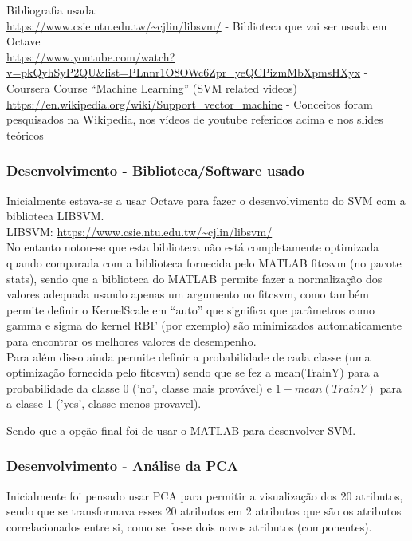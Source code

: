 \documentclass[portugues,final]{revdetua}
\begin{document}
Bibliografia usada:\\
\url{https://www.csie.ntu.edu.tw/~cjlin/libsvm/} - Biblioteca que vai ser usada em Octave\\
\url{https://www.youtube.com/watch?v=pkQyhSyP2QU&list=PLnnr1O8OWc6Zpr_yeQCPizmMbXpmsHXyx} - Coursera Course “Machine Learning” (SVM related videos)\\
\url{https://en.wikipedia.org/wiki/Support_vector_machine} - Conceitos foram pesquisados na Wikipedia, nos vídeos de youtube referidos acima e nos slides teóricos

\subsubsection{Desenvolvimento - Biblioteca/Software usado}
Inicialmente estava-se a usar Octave para fazer o desenvolvimento do SVM com a biblioteca LIBSVM.\\
LIBSVM: \url{https://www.csie.ntu.edu.tw/~cjlin/libsvm/}\\
No entanto notou-se que esta biblioteca não está completamente optimizada quando comparada com a biblioteca fornecida pelo MATLAB fitcsvm (no pacote stats), sendo que a biblioteca do MATLAB permite fazer a normalização dos valores adequada usando apenas um argumento no fitcsvm, como também permite definir o KernelScale em “auto” que significa que parâmetros como gamma e sigma do kernel RBF (por exemplo) são minimizados automaticamente para encontrar os melhores valores de desempenho.\\
Para além disso ainda permite definir a probabilidade de cada classe (uma optimização fornecida pelo fitcsvm) sendo que se fez a mean(TrainY) para a probabilidade da classe 0 ('no', classe mais provável) e $1 - mean(TrainY)$ para a classe 1 ('yes', classe menos provavel).

Sendo que a opção final foi de usar o MATLAB para desenvolver SVM. 

\subsubsection{Desenvolvimento - Análise da PCA}

Inicialmente foi pensado usar PCA para permitir a visualização dos 20 atributos, sendo que se transformava esses 20 atributos em 2 atributos que são os atributos correlacionados entre si, como se fosse dois novos atributos (componentes).
\end{document}
